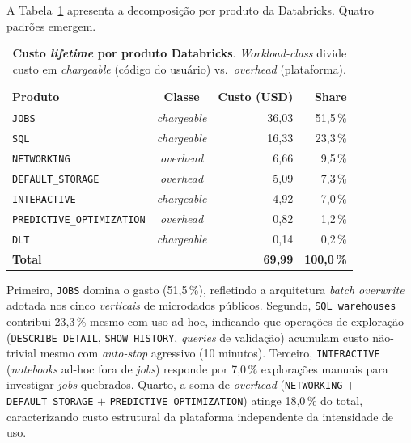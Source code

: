 \documentclass[12pt,a4paper,oneside]{article}
\begin{document}
A Tabela~\ref{tab:byproduct} apresenta a decomposição por produto
da Databricks. Quatro padrões emergem.

\begin{table}[H]
\centering
\caption{\textbf{Custo \textit{lifetime} por produto Databricks}.
        \textit{Workload-class} divide custo em
        \textit{chargeable} (código do usuário) vs.\ \textit{overhead}
        (plataforma).}
\label{tab:byproduct}
\begin{tabular}{lcrr}
\toprule
\textbf{Produto} & \textbf{Classe} & \textbf{Custo (USD)} & \textbf{Share} \\
\midrule
\texttt{JOBS}                       & \textit{chargeable} & 36,03 & 51,5\,\% \\
\texttt{SQL}                        & \textit{chargeable} & 16,33 & 23,3\,\% \\
\texttt{NETWORKING}                 & \textit{overhead}   & \phantom{0}6,66 & \phantom{0}9,5\,\% \\
\texttt{DEFAULT\_STORAGE}           & \textit{overhead}   & \phantom{0}5,09 & \phantom{0}7,3\,\% \\
\texttt{INTERACTIVE}                & \textit{chargeable} & \phantom{0}4,92 & \phantom{0}7,0\,\% \\
\texttt{PREDICTIVE\_OPTIMIZATION}   & \textit{overhead}   & \phantom{0}0,82 & \phantom{0}1,2\,\% \\
\texttt{DLT}                        & \textit{chargeable} & \phantom{0}0,14 & \phantom{0}0,2\,\% \\
\midrule
\textbf{Total}                      & \textemdash{}       & \textbf{69,99} & \textbf{100,0\,\%} \\
\bottomrule
\end{tabular}
\end{table}

Primeiro, \texttt{JOBS} domina o gasto (51,5\,\%), refletindo a
arquitetura \textit{batch overwrite} adotada nos cinco
\textit{verticais} de microdados públicos. Segundo, \texttt{SQL
warehouses} contribui 23,3\,\% mesmo com uso ad-hoc, indicando que
operações de exploração (\texttt{DESCRIBE DETAIL},
\texttt{SHOW HISTORY}, \textit{queries} de validação) acumulam
custo não-trivial mesmo com \textit{auto-stop} agressivo (10
minutos). Terceiro, \texttt{INTERACTIVE} (\textit{notebooks}
ad-hoc fora de \textit{jobs}) responde por 7,0\,\%
\textemdash{} explorações manuais para investigar \textit{jobs}
quebrados. Quarto, a soma de \textit{overhead}
(\texttt{NETWORKING} \(+\) \texttt{DEFAULT\_STORAGE} \(+\)
\texttt{PREDICTIVE\_OPTIMIZATION}) atinge 18,0\,\% do total,
caracterizando custo estrutural da plataforma independente da
intensidade de uso.
\end{document}
